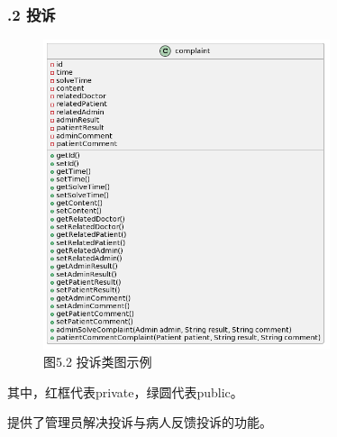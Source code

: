 \documentclass[24pt,a4paper]{article}%
\begin{document}
\subsubsection*{.2 投诉}
\begin{figure}[H]
    \centering
    \includegraphics[width=0.75\textwidth]{images/complaint.png}
    \caption*{图5.2 投诉类图示例}
\end{figure}
其中，红框代表private，绿圆代表public。\par
提供了管理员解决投诉与病人反馈投诉的功能。\par
\end{document}
